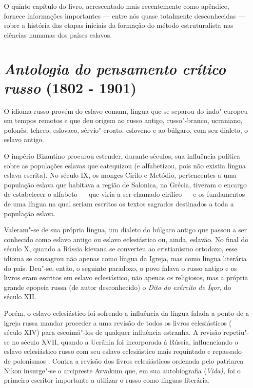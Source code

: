 O quinto capítulo do livro, acrescentado mais recentemente como
apêndice, fornece informações importantes --- entre nós quase totalmente
desconhecidas --- sobre a história das etapas iniciais da formação do
método estruturalista nas ciências humanas dos países eslavos.

\chapter{\emph{Antologia do pensamento crítico russo} (1802 - 1901) }

O idioma russo provém do eslavo comum, língua que se separou do
indo"-europeu em tempos remotos e que deu origem ao russo antigo,
russo"-branco, ucraniano, polonês, tcheco, eslovaco, sérvio"-croato,
esloveno e ao búlgaro, com seu dialeto, o eslavo antigo.

O império Bizantino procurou estender, durante séculos, sua influência
política sobre as populações eslavas que catequizou (e alfabetizou, pois
não existia língua eslava escrita). No século IX, os monges Cirilo e
Metódio, pertencentes a uma população eslava que habitava a região de
Salonica, na Grécia, tiveram o encargo de estabelecer o alfabeto --- que
viria a ser chamado cirílico --- e os fundamentos de uma língua na qual
seriam escritos os textos sagrados destinados a toda a população eslava.

Valeram"-se de sua própria língua, um dialeto do búlgaro antigo que
passou a ser conhecido como eslavo antigo ou eslavo eclesiástico ou,
ainda, eslavão. No final do século X, quando a Rússia kievana se
converteu ao cristianismo ortodoxo, esse idioma se consagrou não apenas
como língua da Igreja, mas como língua literária do país. Deu"-se, então,
o seguinte paradoxo, o povo falava o russo antigo e os livros eram
escritos em eslavo eclesiástico, não apenas os religiosos, mas a própria
grande epopeia russa (de autor desconhecido) o \emph{Dito do exército de
Ígor}, do século XII.

Porém, o eslavo eclesiástico foi sofrendo a influência da língua falada
a ponto de a igreja russa mandar proceder a uma revisão de todos os
livros eclesiásticos ( século XIV) para escoimá"-los de qualquer
influência estranha. A revisão repetiu"-se no século XVII, quando a
Ucrânia foi incorporada à Rússia, influenciando o eslavo eclesiástico
russo com seu eslavo eclesiástico mais requintado e repassado de
polonismos . Contra a revisão dos livros eclesiásticos ordenada pelo
patriarca Nikon insurge"-se o arcipreste Avvakum que, em sua
autobiografia (\emph{Vida),} foi o primeiro escritor importante a
utilizar o russo como línguas literária.

